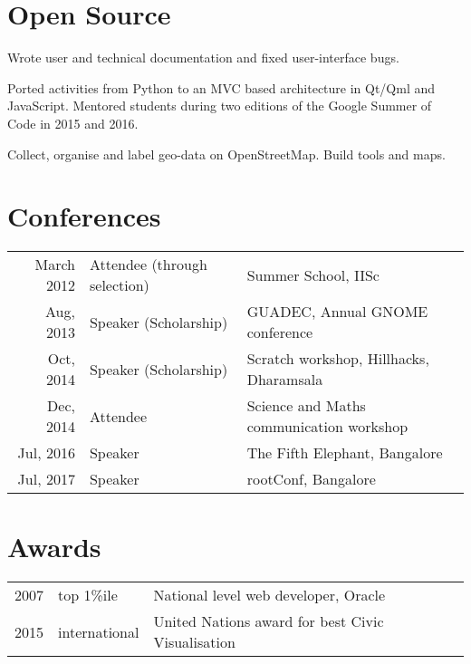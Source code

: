 \documentclass[]{deedy-resume-openfont}
\begin{document}
\begin{minipage}[t]{0.66\textwidth}

\section{Open Source}
Wrote user and technical documentation and fixed user-interface bugs.
\sectionsep

Ported activities from Python to an MVC based architecture in Qt/Qml and JavaScript.
Mentored students during two editions of the Google Summer of Code in 2015 and 2016.
\sectionsep

Collect, organise and label geo-data on OpenStreetMap. Build tools and maps.
\sectionsep


\section{Conferences}
\begin{tabular}{rll}
March 2012       & Attendee (through selection) & Summer School, IISc \\
Aug, 2013	     & Speaker (Scholarship) & GUADEC, Annual GNOME conference\\
Oct, 2014	     & Speaker (Scholarship) & Scratch workshop, Hillhacks, Dharamsala\\
Dec, 2014	     & Attendee & Science and Maths communication workshop\\
Jul, 2016	     & Speaker & The Fifth Elephant, Bangalore\\
Jul, 2017	     & Speaker & rootConf, Bangalore\\
\end{tabular}
\sectionsep


\section{Awards} 

\begin{tabular}{rll}
2007 	& top 1\%ile    & National level web developer, Oracle\\
2015   & international   & United Nations award for best Civic Visualisation\\
\end{tabular}
\sectionsep

\end{minipage} 
\end{document}
